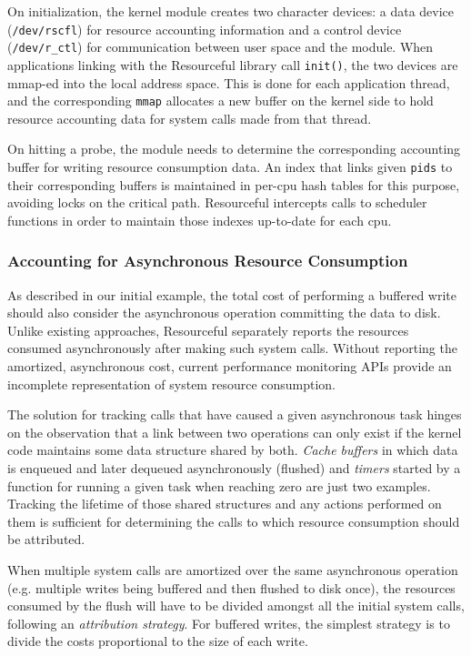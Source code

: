 \documentclass[letterpaper,twocolumn,10pt]{article}
\newcommand{\pname}{Resourceful}
\begin{document}
On initialization, the kernel module creates two character devices: a data
device (\texttt{/dev/rscfl}) for resource accounting information and a control
device (\texttt{/dev/r\_ctl}) for communication between user space and the
module. When applications linking with the \pname{ }library call
\texttt{init()}, the two devices are mmap-ed into the local address space. This
is done for each application thread, and the corresponding \texttt{mmap}
allocates a new buffer on the kernel side to hold resource accounting data for
system calls made from that thread.

On hitting a probe, the module needs to determine the corresponding accounting
buffer for writing resource consumption data. An index that links given
\texttt{pids} to their corresponding buffers is maintained in per-cpu hash
tables for this purpose, avoiding locks on the critical path. \pname{ }
intercepts calls to scheduler functions in order to maintain those indexes
up-to-date for each cpu.

\subsubsection{Accounting for Asynchronous Resource Consumption}
As described in our initial example, the total cost of performing a buffered
write should also consider the asynchronous operation committing the data to
disk. Unlike existing approaches, \pname{} separately reports the resources
consumed asynchronously after making such system calls.  Without reporting the
amortized, asynchronous cost, current performance monitoring APIs provide an
incomplete representation of system resource consumption.

The solution for tracking calls that have caused a given asynchronous task
hinges on the observation that a link between two operations can only exist if
the kernel code maintains some data structure shared by both. \textit{Cache
buffers} in which data is enqueued and later dequeued asynchronously (flushed)
and \textit{timers} started by a function for running a given task when reaching
zero are just two examples. Tracking the lifetime of those shared structures and
any actions performed on them is sufficient for determining the calls to which
resource consumption should be attributed.

When multiple system calls are amortized over the same asynchronous operation
(e.g. multiple writes being buffered and then flushed to disk once),
the resources consumed by the flush will have to be divided amongst all the
initial system calls, following an \textit{attribution strategy}. For buffered writes,
the simplest strategy is to divide the costs proportional to the size of each
write.
\end{document}
